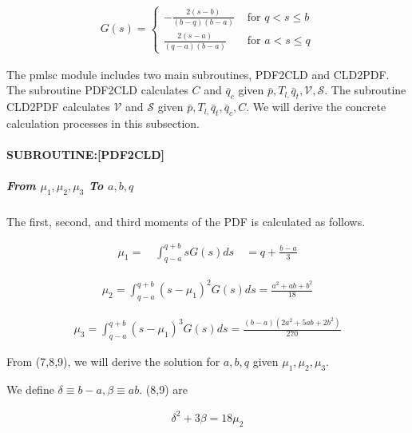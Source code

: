 \begin{eqnarray}
G(s)=\left\{\begin{array}{cl}-\frac{2(s-b)}{(b-q)(b-a)} & \text { for } q<s \leq b \\ \frac{2(s-a)}{(q-a)(b-a)} & \text { for } a<s \leq q\end{array}\right.
\end{eqnarray}

The pmlsc module includes two main subroutines, PDF2CLD and CLD2PDF. The
subroutine PDF2CLD calculates \(C\) and \(\bar{q}_{c}\) given
\(\bar{p}, T_{l,} \bar{q}_{t}, \mathcal{V}, \mathcal{S}\). The
subroutine CLD2PDF calculates \(\mathcal{V}\) and \(\mathcal{S}\) given
\(\bar{p}, T_{l,} \bar{q}_{t}, \bar{q}_{c}, C\). We will derive the
concrete calculation processes in this subsection.

\hypertarget{subroutinepdf2cld}{%
\paragraph{SUBROUTINE:{[}PDF2CLD{]}}\label{subroutinepdf2cld}}

\hypertarget{from-mu_1-mu_2-mu_3-to-abq}{%
\subparagraph{\texorpdfstring{From \(\mu_{1}, \mu_{2}, \mu_{3}\) To
\(a,b,q\)}{From \textbackslash mu\_\{1\}, \textbackslash mu\_\{2\}, \textbackslash mu\_\{3\} To a,b,q}}\label{from-mu_1-mu_2-mu_3-to-abq}}

The first, second, and third moments of the PDF is calculated as
follows.

\begin{eqnarray}
\mu_{1}=\quad \int_{q-a}^{q+b}sG(s)ds \quad=q+\frac{b-a}{3}
\label{E08-7}
\end{eqnarray}

\begin{eqnarray}
\mu_{2}=\int_{q-a}^{q+b}\left(s-\mu_{1}\right)^{2} G(s)ds=\frac{a^{2}+a b+b^{2}}{18}
\label{E08-8}
\end{eqnarray}

\begin{eqnarray}
\mu_{3}=\int_{q-a}^{q+b}\left(s-\mu_{1}\right)^{3} G(s)ds=\frac{(b-a)\left(2 a^{2}+5 a b+2 b^{2}\right)}{270}
\label{E08-9}
\end{eqnarray}

From (7,8,9), we will derive the solution for \(a,b , q\) given
\(\mu_{1}, \mu_{2}, \mu_{3}\).

We define \(\delta \equiv b-a, \beta \equiv a b\). (8,9) are

\begin{eqnarray}
\delta^{2}+3 \beta=18 \mu_{2}
\end{eqnarray}

